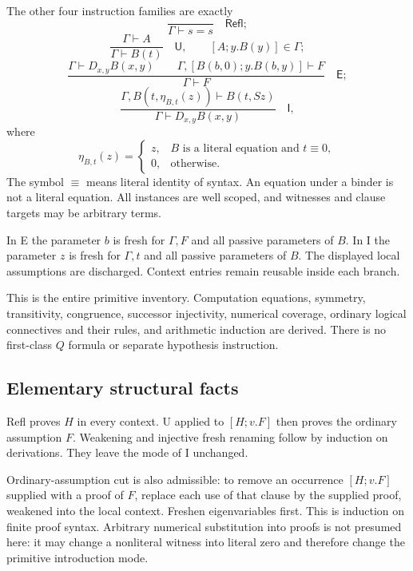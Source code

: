 \documentclass[11pt,letterpaper]{article}
\theoremstyle{definition}
\newcommand{\syn}{\equiv}
\newcommand{\Refl}{\mathsf{Refl}}
\begin{document}
The other four instruction families are exactly
\[
           \frac{}{\Gamma\vdash s=s}\quad\Refl;
 \tag{R}\label{rule:refl}
\]
\[
 \frac{\Gamma\vdash A}{\Gamma\vdash B(t)}\quad\mathsf U,
 \qquad [A;y.B(y)]\in\Gamma;
 \tag{U}\label{rule:use}
\]
\[
 \frac{\Gamma\vdash D_{x,y}B(x,y)\qquad
       \Gamma,[B(b,0);y.B(b,y)]\vdash F}
      {\Gamma\vdash F}\quad\mathsf E;
 \tag{E}\label{rule:elim}
\]
\[
 \frac{\Gamma,B(t,\eta_{B,t}(z))\vdash B(t,Sz)}
      {\Gamma\vdash D_{x,y}B(x,y)}\quad\mathsf I,
 \tag{I}\label{rule:intro}
\]
where
\[
 \eta_{B,t}(z)=
 \begin{cases}
   z,& B\text{ is a literal equation and }t\syn0,\\
   0,&\text{otherwise}.
 \end{cases}
\]
The symbol $\syn$ means literal identity of syntax. An equation
under a binder is not a literal equation. All instances are well
scoped, and witnesses and clause targets may be arbitrary terms.

In E the parameter $b$ is fresh for $\Gamma,F$ and all passive
parameters of $B$. In I the parameter $z$ is fresh for $\Gamma,t$
and all passive parameters of $B$. The displayed local assumptions
are discharged. Context entries remain reusable inside each branch.

This is the entire primitive inventory. Computation equations,
symmetry, transitivity, congruence, successor injectivity, numerical
coverage, ordinary logical connectives and their rules, and arithmetic
induction are derived. There is no first-class $Q$ formula or separate
hypothesis instruction.

\subsection{Elementary structural facts}

Refl proves $H$ in every context. U applied to $[H;v.F]$ then
proves the ordinary assumption $F$. Weakening and injective fresh
renaming follow by induction on derivations. They leave the mode
of I unchanged.

Ordinary-assumption cut is also admissible: to remove an occurrence
$[H;v.F]$ supplied with a proof of $F$, replace each use of that
clause by the supplied proof, weakened into the local context.
Freshen eigenvariables first. This is induction on finite proof
syntax. Arbitrary numerical substitution into proofs is not presumed
here: it may change a nonliteral witness into literal zero and
therefore change the primitive introduction mode.
\end{document}
